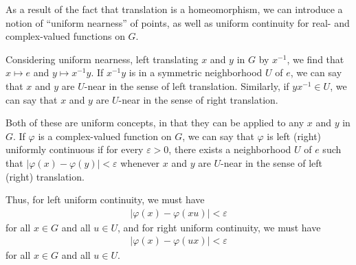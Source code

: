 \documentclass[12pt]{extarticle}
\newcommand{\ve}{\varepsilon}
\theoremstyle{plain}
\theoremstyle{definition}
\theoremstyle{note}
\renewcommand{\newline}{\hfill\break}
\begin{document}
As a result of the fact that translation is a homeomorphism, we can introduce a notion of ``uniform nearness'' of points, as well as uniform continuity for real- and complex-valued functions on $G$.\newline

Considering uniform nearness, left translating $x$ and $y$ in $G$ by $x^{-1}$, we find that $x\mapsto e$ and $y\mapsto x^{-1} y$. If $x^{-1}y$ is in a symmetric neighborhood $U$ of $e$, we can say that $x$ and $y$ are $U$-near in the sense of left translation. Similarly, if $yx^{-1}\in U$, we can say that $x$ and $y$ are $U$-near in the sense of right translation.\newline

Both of these are uniform concepts, in that they can be applied to any $x$ and $y$ in $G$. If $\varphi$ is a complex-valued function on $G$, we can say that $\varphi$ is left (right) uniformly continuous if for every $\ve > 0$, there exists a neighborhood $U$ of $e$ such that $\left\vert \varphi(x)-\varphi(y) \right\vert < \ve$ whenever $x$ and $y$ are $U$-near in the sense of left (right) translation.\newline

Thus, for left uniform continuity, we must have
\begin{align*}
  \left\vert \varphi(x) - \varphi(xu) \right\vert < \ve
\end{align*}
 for all $x\in G$ and all $u\in U$, and for right uniform continuity, we must have
 \begin{align*}
   \left\vert \varphi(x) - \varphi(ux)  \right\vert < \ve
 \end{align*}
 for all $x\in G$ and all $u\in U$.\newline
\end{document}

